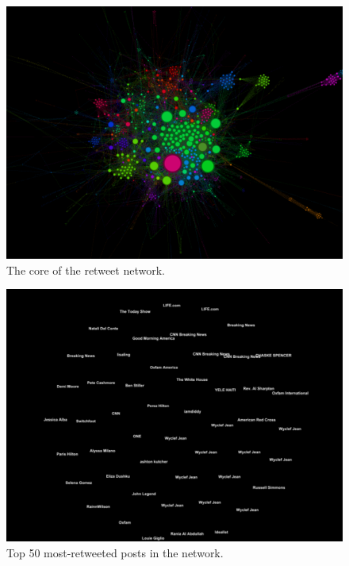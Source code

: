 \documentclass[a4paper, 11pt, titlepage]{article}
\begin{document}
\begin{figure}[h]
\centering
\label{fig:rt_net_core}
\includegraphics[width=120mm]{../figures/rt_net_core}
\caption{The core of the retweet network.}
\end{figure}

\begin{figure}[h]
\centering
\label{fig:rt_net_top_50}
\includegraphics[width=120mm]{../figures/rt_net_top_50_tweets}
\caption{Top 50 most-retweeted posts in the network.}
\end{figure}
\end{document}
